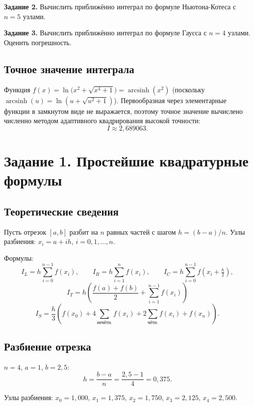 \documentclass[a4paper, final]{article}
\begin{document}
\textbf{Задание 2.} Вычислить приближённо интеграл по формуле Ньютона-Котеса
с $n = 5$ узлами.

\textbf{Задание 3.} Вычислить приближённо интеграл по формуле Гаусса с $n = 4$
узлами. Оценить погрешность.

\subsection*{Точное значение интеграла}

Функция $f(x) = \ln\!\bigl(x^2 + \sqrt{x^4+1}\bigr) = \operatorname{arcsinh}(x^2)$
(поскольку $\operatorname{arcsinh}(u) = \ln(u+\sqrt{u^2+1})$). Первообразная через
элементарные функции в замкнутом виде не выражается, поэтому точное значение
вычислено численно методом адаптивного квадрирования высокой точности:
\[
I \approx 2{,}689063.
\]

\newpage

\section{Задание 1. Простейшие квадратурные формулы}

\subsection{Теоретические сведения}

Пусть отрезок $[a,b]$ разбит на $n$ равных частей с шагом $h = (b-a)/n$.
Узлы разбиения: $x_i = a + ih$, $i = 0, 1, \ldots, n$.

Формулы:
\[
I_L = h\sum_{i=0}^{n-1}f(x_i), \qquad
I_R = h\sum_{i=1}^{n}f(x_i), \qquad
I_C = h\sum_{i=0}^{n-1}f\!\left(x_i + \tfrac{h}{2}\right),
\]
\[
I_T = h\!\left(\frac{f(a)+f(b)}{2} + \sum_{i=1}^{n-1}f(x_i)\right)\]
\[
I_S = \frac{h}{3}\!\left(f(x_0) + 4\!\sum_{\text{нечётн.}}\!f(x_i)
      + 2\!\sum_{\text{чётн.}}\!f(x_i) + f(x_n)\right).
\]

\subsection{Разбиение отрезка}

$n = 4$, $a = 1$, $b = 2{,}5$:
\[
h = \frac{b-a}{n} = \frac{2{,}5-1}{4} = 0{,}375.
\]

Узлы разбиения: $x_0 = 1{,}000$, $x_1 = 1{,}375$, $x_2 = 1{,}750$,
$x_3 = 2{,}125$, $x_4 = 2{,}500$.
\end{document}
